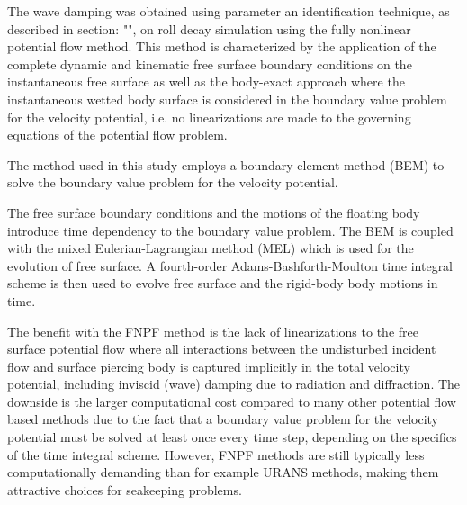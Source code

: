 \label{fnpf-method} The wave damping was obtained using parameter an
identification technique, as described in section: "",
on roll decay simulation using the fully nonlinear potential flow
method. This method is characterized by the application of the complete
dynamic and kinematic free surface boundary conditions on the
instantaneous free surface as well as the body-exact approach where the
instantaneous wetted body surface is considered in the boundary value
problem for the velocity potential, i.e. no linearizations are made to
the governing equations of the potential flow problem.

\quad The method used in this study employs a boundary element method
(BEM) \citep{7505983/FD4N3DW2} to solve the boundary value problem for
the velocity potential.

\quad The free surface boundary conditions and the motions of the
floating body introduce time dependency to the boundary value problem.
The BEM is coupled with the mixed Eulerian-Lagrangian method (MEL)
\citep{7505983/ZKB494GT} which is used for the evolution of free surface.
A fourth-order Adams-Bashforth-Moulton time integral scheme is then used
to evolve free surface and the rigid-body body motions in time.

\quad The benefit with the FNPF method is the lack of linearizations to
the free surface potential flow where all interactions between the
undisturbed incident flow and surface piercing body is captured
implicitly in the total velocity potential, including inviscid (wave)
damping due to radiation and diffraction. The downside is the larger
computational cost compared to many other potential flow based methods
due to the fact that a boundary value problem for the velocity potential
must be solved at least once every time step, depending on the specifics
of the time integral scheme. However, FNPF methods are still typically
less computationally demanding than for example URANS methods, making
them attractive choices for seakeeping problems.

    